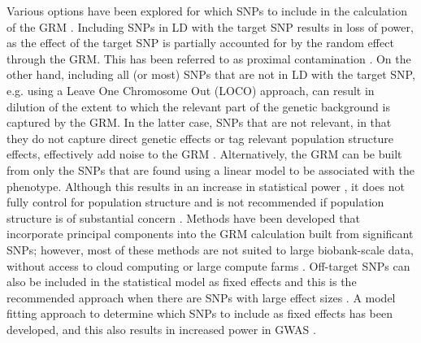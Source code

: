 \documentclass[doublespacing]{bmcart}
\begin{document}
Various options have been explored for which SNPs to include in the calculation of the GRM \cite{yang2014advantages}. Including SNPs in LD with the target SNP results in loss of power, as the effect of the target SNP is partially accounted for by the random effect through the GRM. This has been referred to as proximal contamination \cite{listgarten2012improved}. On the other hand, including all (or most) SNPs that are not in LD with the target SNP, e.g. using a Leave One Chromosome Out (LOCO) approach, can result in dilution of the extent to which the relevant part of the genetic background is captured by the GRM. In the latter case, SNPs that are not relevant, in that they do not capture direct genetic effects or tag relevant population structure effects, effectively add noise to the GRM \cite{listgarten2012improved}. Alternatively, the GRM can be built from only the SNPs that are found using a linear model to be associated with the phenotype. Although this results in an increase in statistical power \cite{fastlmm,yang2014advantages,lippert2013benefits}, it does not fully control for population structure and is not recommended if population structure is of substantial concern \cite{BOLT,yang2014advantages}. Methods have been developed that incorporate principal components into the GRM calculation built from significant SNPs; however, most of these methods are not suited to large biobank-scale data, without access to cloud computing or large compute farms \cite{tucker2014improving,canela2018atlas}. Off-target SNPs can also be included in the statistical model as fixed effects and this is the recommended approach when there are SNPs with large effect sizes \cite{yang2014advantages}. A model fitting approach to determine which SNPs to include as fixed effects has been developed, and this also results in increased power in GWAS \cite{listgarten2012improved}.  

\par 
\end{document}
